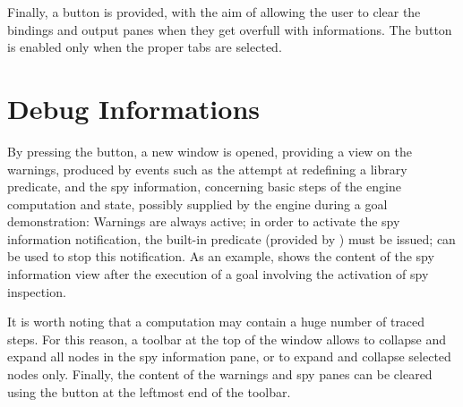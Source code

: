 Finally, a  button is provided, with the aim of allowing the user to clear the bindings and output panes when they get overfull with informations.
%
The button is enabled only when the proper tabs are selected.

\section{Debug Informations}

By pressing the  button, a new window is opened, providing a view on the warnings, produced by events such as the attempt at redefining a library predicate, and the spy information, concerning basic steps of the engine computation and state, possibly supplied by the engine during a goal demonstration:
%
Warnings are always active;
%
in order to activate the spy information notification, the  built-in predicate (provided by ) must be issued;
%
 can be used to stop this notification.
%
As an example,  shows the content of the spy information view after the
execution of a goal involving the activation of spy inspection.

It is worth noting that a computation may contain a huge number of traced steps.
%
For this reason, a toolbar at the top of the window allows to collapse and expand all nodes in the spy information pane, or to expand and collapse selected nodes only.
%
Finally, the content of the warnings and spy panes can be cleared using the  button at the leftmost end of the toolbar.

